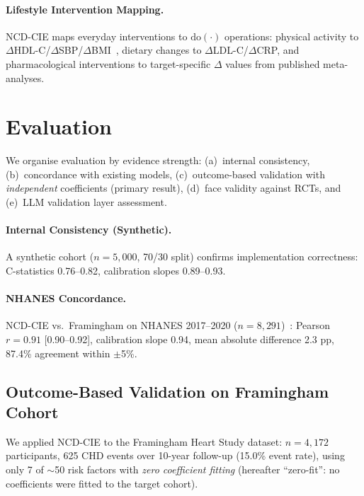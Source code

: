 \documentclass[runningheads]{llncs}
\begin{document}
\paragraph{Lifestyle Intervention Mapping.}
NCD-CIE maps everyday interventions to $\mathrm{do}(\cdot)$
operations: physical activity to $\Delta$HDL-C/$\Delta$SBP/$\Delta$BMI~\cite{naci2019comparative},
dietary changes to $\Delta$LDL-C/$\Delta$CRP, and
pharmacological interventions to target-specific $\Delta$ values
from published meta-analyses.

\section{Evaluation}\label{sec:validation}

We organise evaluation by evidence strength:
(a)~internal consistency,
(b)~concordance with existing models,
(c)~outcome-based validation with \emph{independent} coefficients
(primary result),
(d)~face validity against RCTs, and
(e)~LLM validation layer assessment.

\paragraph{Internal Consistency (Synthetic).}
A synthetic cohort ($n = 5{,}000$, 70/30 split) confirms
implementation correctness: C-statistics 0.76--0.82, calibration
slopes 0.89--0.93.

\paragraph{NHANES Concordance.}
NCD-CIE vs.\ Framingham on NHANES 2017--2020
($n = 8{,}291$)~\cite{nhanes2020}:
Pearson $r = 0.91$ [0.90--0.92],
calibration slope 0.94, mean absolute difference 2.3 pp,
87.4\% agreement within $\pm$5\%.

\subsection{Outcome-Based Validation on Framingham Cohort}\label{sec:framingham}

We applied NCD-CIE to the Framingham Heart Study dataset:
$n = 4{,}172$ participants, 625 CHD events over 10-year follow-up
(15.0\% event rate), using only 7 of ${\sim}$50 risk factors
with \emph{zero coefficient fitting} (hereafter ``zero-fit'':
no coefficients were fitted to the target cohort).
\end{document}

